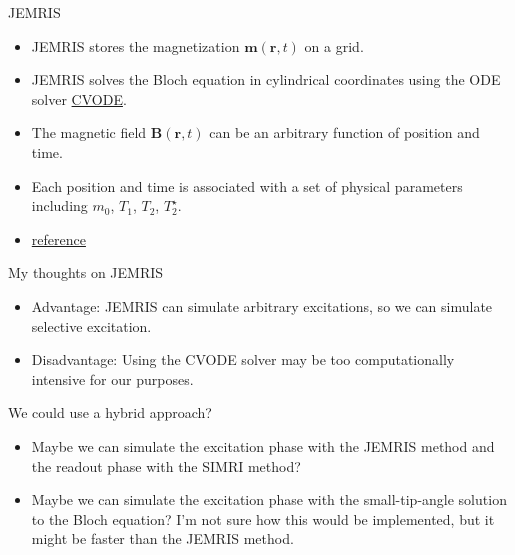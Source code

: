 \documentclass{beamer}
\begin{document}
\begin{frame}{JEMRIS}
\begin{itemize}
\item JEMRIS stores the magnetization $\mathbf{m}(\mathbf{r},t)$ on a grid.
\item JEMRIS solves the Bloch equation in cylindrical coordinates using the ODE solver \href{https://computing.llnl.gov/projects/sundials/cvode}{CVODE}.
\item The magnetic field $\mathbf{B}(\mathbf{r},t)$ can be an arbitrary function of position and time.
\item Each position and time is associated with a set of physical parameters including $m_0$, $T_1$, $T_2$, $T_2^\star$.
\item \href{https://www.ncbi.nlm.nih.gov/pubmed/20577987}{reference}
\end{itemize}
\end{frame}

\begin{frame}{My thoughts on JEMRIS}
\begin{itemize}
\item Advantage: JEMRIS can simulate arbitrary excitations, so we can simulate selective excitation.
\item Disadvantage: Using the CVODE solver may be too computationally intensive for our purposes.
\end{itemize}
\end{frame}

\begin{frame}{We could use a hybrid approach?}
\begin{itemize}
\item Maybe we can simulate the excitation phase with the JEMRIS method and the readout phase with the SIMRI method?
\item Maybe we can simulate the excitation phase with the small-tip-angle solution to the Bloch equation? I'm not sure how this would be implemented, but it might be faster than the JEMRIS method.
\end{itemize}
\end{frame}
\end{document}
